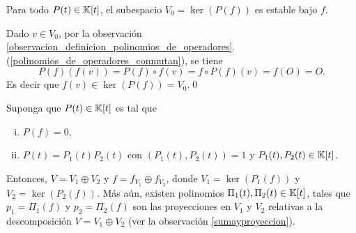 \begin{prop}
Para todo $P(t)\in \mathbb{K}[t]$, el subespacio $V_0=\ker\left(P(f)\right)$ es estable bajo $f$.
\end{prop}

\dem Dado $v\in V_0$, por la observación \ref{observacion_definicion_polinomios_de_operadores}.(\ref{polinomios_de_operadores_conmutan}), se tiene
$$P(f)\left(f(v)\right)=P(f)\circ f(v)=f\circ P(f)(v)=f(O)=O.$$
Es decir que $f(v)\in\ker\left(P(f)\right)=V_0$.\qed

\begin{prop}
Suponga que $P(t)\in \mathbb{K}[t]$ es tal que
\begin{enumerate}[(i)]
  \item $P(f)=0$,
  \item $P(t)=P_1(t)P_2(t)$ con $\left(P_1(t),P_2(t)\right)=1$ y $P_1(t),P_2(t)\in\mathbb{K}[t]$.
\end{enumerate}
Entonces, $V=V_1\oplus V_2$ y $f=f_{V_1}\oplus f_{V_2}$, donde $V_1=\ker\left(P_1(f)\right)$ y $V_2=\ker\left(P_2(f)\right)$. M\'as a\'un, existen polinomios $\Pi_1(t),\Pi_2(t)\in \mathbb{K}[t]$, tales que $p_1=\Pi_1(f)$ y $p_2=\Pi_2(f)$ son las proyecciones en $V_1$ y $V_2$ relativas a la descomposición $V=V_1\oplus V_2$ (ver la observación \ref{sumayproyeccion}).
\end{prop}

